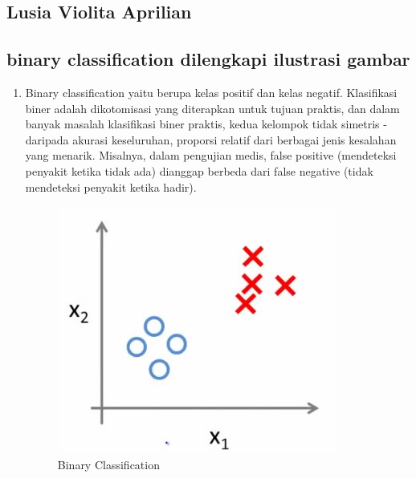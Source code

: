 \subsection{Lusia Violita Aprilian}

\subsection{binary classification dilengkapi ilustrasi gambar}
\begin{enumerate}
\item Binary classification yaitu berupa kelas positif dan kelas negatif. Klasifikasi biner adalah dikotomisasi yang diterapkan untuk tujuan praktis, dan dalam banyak masalah klasifikasi biner praktis, kedua kelompok tidak simetris - daripada akurasi keseluruhan, proporsi relatif dari berbagai jenis kesalahan yang menarik. Misalnya, dalam pengujian medis, false positive (mendeteksi penyakit ketika tidak ada) dianggap berbeda dari false negative (tidak mendeteksi penyakit ketika hadir).
\begin{figure}[ht]
\centering
\includegraphics[scale=0.5]{figures/f1.jpg}
\caption{Binary Classification}
\label{contoh}
\end{figure}


\end{enumerate}
